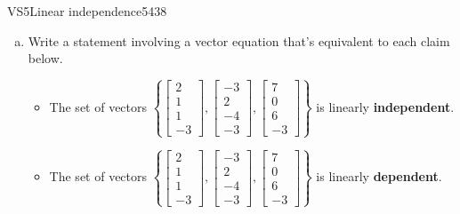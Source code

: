 \begin{exercise}{VS5}{Linear independence}{5438} 
\begin{exerciseStatement} 

\begin{enumerate}[(a)]
\item  

 Write a statement involving a vector equation that's equivalent to each claim below. 

 

\begin{itemize}
\item  

 The set of vectors \(\left\{ \left[\begin{array}{c}
2 \\
1 \\
1 \\
-3
\end{array}\right] , \left[\begin{array}{c}
-3 \\
2 \\
-4 \\
-3
\end{array}\right] , \left[\begin{array}{c}
7 \\
0 \\
6 \\
-3
\end{array}\right] \right\}\) is linearly \textbf{independent}. 

 
\item  

 The set of vectors \(\left\{ \left[\begin{array}{c}
2 \\
1 \\
1 \\
-3
\end{array}\right] , \left[\begin{array}{c}
-3 \\
2 \\
-4 \\
-3
\end{array}\right] , \left[\begin{array}{c}
7 \\
0 \\
6 \\
-3
\end{array}\right] \right\}\) is linearly \textbf{dependent}. 

 
\end{itemize}


\end{enumerate}
\end{exerciseStatement}
\end{exercise}
